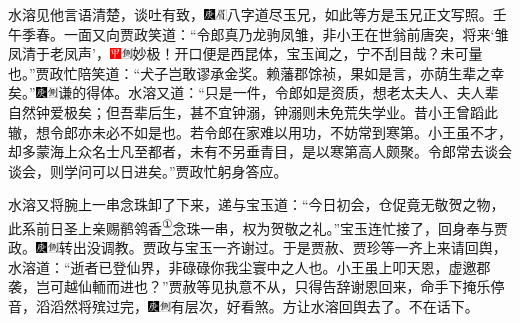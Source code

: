 水溶见他言语清楚，谈吐有致，{\includegraphics[width=3mm]{../Images/00004}\includegraphics[width=3mm]{../Images/00010}\footnotesize \kaishu 八字道尽玉兄，如此等方是玉兄正文写照。壬午季春。}一面又向贾政笑道：``令郎真乃龙驹凤雏，非小王在世翁前唐突，将来`雏凤清于老凤声'，{\includegraphics[width=3mm]{../Images/00002}\includegraphics[width=3mm]{../Images/00011}\footnotesize \kaishu 妙极！开口便是西昆体，宝玉闻之，宁不刮目哉？}未可量也。''贾政忙陪笑道：``犬子岂敢谬承金奖。赖藩郡馀祯，果如是言，亦荫生辈之幸矣。''{\includegraphics[width=3mm]{../Images/00004}\includegraphics[width=3mm]{../Images/00011}\footnotesize \kaishu 谦的得体。}水溶又道：``只是一件，令郎如是资质，想老太夫人、夫人辈自然钟爱极矣；但吾辈后生，甚不宜钟溺，钟溺则未免荒失学业。昔小王曾蹈此辙，想令郎亦未必不如是也。若令郎在家难以用功，不妨常到寒第。小王虽不才，却多蒙海上众名士凡至都者，未有不另垂青目，是以寒第高人颇聚。令郎常去谈会谈会，则学问可以日进矣。''贾政忙躬身答应。

水溶又将腕上一串念珠卸了下来，递与宝玉道：``今日初会，仓促竟无敬贺之物，此系前日圣上亲赐鹡鸰香\href{../Text/part0019_split_000.html\#lnkback_1_a}{\textsuperscript{①}}念珠一串，权为贺敬之礼。''宝玉连忙接了，回身奉与贾政。{\includegraphics[width=3mm]{../Images/00004}\includegraphics[width=3mm]{../Images/00011}\footnotesize \kaishu 转出没调教。}贾政与宝玉一齐谢过。于是贾赦、贾珍等一齐上来请回舆，水溶道：``逝者已登仙界，非碌碌你我尘寰中之人也。小王虽上叩天恩，虚邀郡袭，岂可越仙輀而进也？''贾赦等见执意不从，只得告辞谢恩回来，命手下掩乐停音，滔滔然将殡过完，{\includegraphics[width=3mm]{../Images/00004}\includegraphics[width=3mm]{../Images/00011}\footnotesize \kaishu 有层次，好看煞。}方让水溶回舆去了。不在话下。

